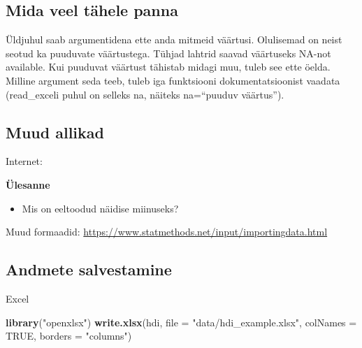 \documentclass[]{article}
\newenvironment{Shaded}{\begin{snugshade}}{\end{snugshade}}
\newcommand{\KeywordTok}[1]{\textcolor[rgb]{0.13,0.29,0.53}{\textbf{#1}}}
\newcommand{\DataTypeTok}[1]{\textcolor[rgb]{0.13,0.29,0.53}{#1}}
\newcommand{\StringTok}[1]{\textcolor[rgb]{0.31,0.60,0.02}{#1}}
\newcommand{\CommentTok}[1]{\textcolor[rgb]{0.56,0.35,0.01}{\textit{#1}}}
\newcommand{\OtherTok}[1]{\textcolor[rgb]{0.56,0.35,0.01}{#1}}
\newcommand{\NormalTok}[1]{#1}
\providecommand{\tightlist}{%
  \setlength{\itemsep}{0pt}\setlength{\parskip}{0pt}}
\begin{document}
\subsection{Mida veel tähele panna}\label{mida-veel-tahele-panna}

Üldjuhul saab argumentidena ette anda mitmeid väärtusi. Olulisemad on
neist seotud ka puuduvate väärtustega. Tühjad lahtrid saavad väärtuseks
NA-not available. Kui puuduvat väärtust tähistab midagi muu, tuleb see
ette öelda. Milline argument seda teeb, tuleb iga funktsiooni
dokumentatsioonist vaadata (read\_exceli puhul on selleks na, näiteks
na=``puuduv väärtus'').

\subsection{Muud allikad}\label{muud-allikad}

Internet:

\begin{Shaded}
\end{Shaded}

\textbf{Ülesanne}

\begin{itemize}
\tightlist
\item
  Mis on eeltoodud näidise miinuseks?
\end{itemize}

Muud formaadid:
\url{https://www.statmethods.net/input/importingdata.html}

\subsection{Andmete salvestamine}\label{andmete-salvestamine}

Excel

\begin{Shaded}
\begin{Highlighting}[]
\KeywordTok{library}\NormalTok{(}\StringTok{"openxlsx"}\NormalTok{)}
\KeywordTok{write.xlsx}\NormalTok{(hdi, }\DataTypeTok{file =} \StringTok{"data/hdi_example.xlsx"}\NormalTok{, }\DataTypeTok{colNames =} \OtherTok{TRUE}\NormalTok{, }\DataTypeTok{borders =} \StringTok{"columns"}\NormalTok{)}
\end{Highlighting}
\end{Shaded}
\end{document}
